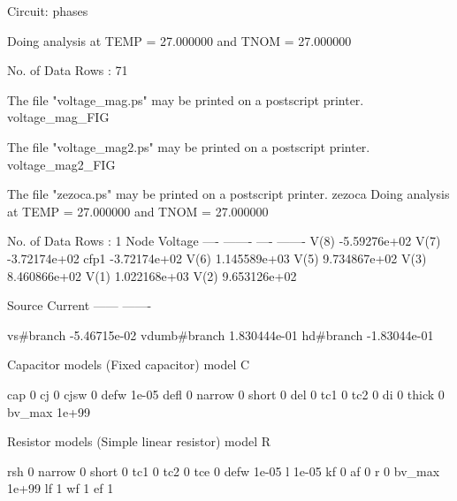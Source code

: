 
Circuit: phases

Doing analysis at TEMP = 27.000000 and TNOM = 27.000000


No. of Data Rows : 71

The file "voltage_mag.ps" may be printed on a postscript printer.
voltage_mag_FIG

The file "voltage_mag2.ps" may be printed on a postscript printer.
voltage_mag2_FIG

The file "zezoca.ps" may be printed on a postscript printer.
zezoca
Doing analysis at TEMP = 27.000000 and TNOM = 27.000000


No. of Data Rows : 1
	Node                                  Voltage
	----                                  -------
	----	-------
	V(8)                             -5.59276e+02
	V(7)                             -3.72174e+02
	cfp1                             -3.72174e+02
	V(6)                             1.145589e+03
	V(5)                             9.734867e+02
	V(3)                             8.460866e+02
	V(1)                             1.022168e+03
	V(2)                             9.653126e+02

	Source	Current
	------	-------

	vs#branch                        -5.46715e-02
	vdumb#branch                     1.830444e-01
	hd#branch                        -1.83044e-01

 Capacitor models (Fixed capacitor)
      model                     C

        cap                     0
         cj                     0
       cjsw                     0
       defw                 1e-05
       defl                     0
     narrow                     0
      short                     0
        del                     0
        tc1                     0
        tc2                     0
         di                     0
      thick                     0
     bv_max                 1e+99

 Resistor models (Simple linear resistor)
      model                     R

        rsh                     0
     narrow                     0
      short                     0
        tc1                     0
        tc2                     0
        tce                     0
       defw                 1e-05
          l                 1e-05
         kf                     0
         af                     0
          r                     0
     bv_max                 1e+99
         lf                     1
         wf                     1
         ef                     1

